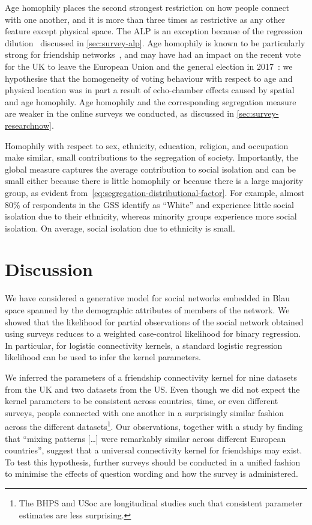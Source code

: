 \documentclass{scrartcl}
\begin{document}
Age homophily places the second strongest restriction on how people connect with one another, and it is more than three times as restrictive as any other feature except physical space. The ALP is an exception because of the regression dilution~\cite{Hutcheon2010} discussed in \cref{sec:survey-alp}. Age homophily is known to be particularly strong for friendship networks~\cite{McPherson2001}, and may have had an impact on the recent vote for the UK to leave the European Union and the general election in 2017~\cite{Goodwin2016,Jennings2017}: we hypothesise that the homogeneity of voting behaviour with respect to age and physical location was in part a result of echo-chamber effects caused by spatial and age homophily. Age homophily and the corresponding segregation measure are weaker in the online surveys we conducted, as discussed in \cref{sec:survey-researchnow}.

Homophily with respect to sex, ethnicity, education, religion, and occupation make similar, small contributions to the segregation of society. Importantly, the global measure captures the average contribution to social isolation and can be small either because there is little homophily or because there is a large majority group, as evident from~\cref{eq:segregation-distributional-factor}. For example, almost 80\% of respondents in the GSS identify as ``White'' and experience little social isolation due to their ethnicity, whereas minority groups experience more social isolation. On average, social isolation due to ethnicity is small.

\section{Discussion}

We have considered a generative model for social networks embedded in Blau space spanned by the demographic attributes of members of the network. We showed that the likelihood for partial observations of the social network obtained using surveys reduces to a weighted case-control likelihood for binary regression. In particular, for logistic connectivity kernels, a standard logistic regression likelihood can be used to infer the kernel parameters.

We inferred the parameters of a friendship connectivity kernel for nine datasets from the UK and two datasets from the US. Even though we did not expect the kernel parameters to be consistent across countries, time, or even different surveys, people connected with one another in a surprisingly similar fashion across the different datasets\footnote{The BHPS and USoc are longitudinal studies such that consistent parameter estimates are less surprising.}. Our observations, together with a study by \textcite{Mossong2008} finding that ``mixing patterns [\ldots] were remarkably similar across different European countries'', suggest that a universal connectivity kernel for friendships may exist. To test this hypothesis, further surveys should be conducted in a unified fashion to minimise the effects of question wording and how the survey is administered.
\end{document}
